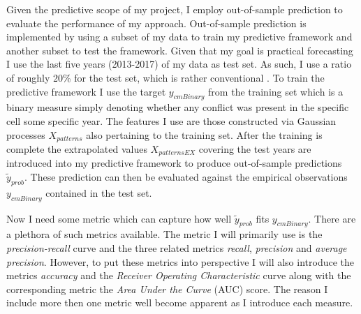 \documentclass[a4paper]{article}
\begin{document}

Given the predictive scope of my project, I employ out-of-sample prediction to evaluate the performance of my approach. Out-of-sample prediction is implemented by using a subset of my data to train my predictive framework and another subset to test the framework. Given that my goal is practical forecasting I use the last five years (2013-2017) of my data as test set. As such, I use a ratio of roughly 20\% for the test set, which is rather conventional \citep{Friedman_2001, Ward_Greenhill_Bakke_2010}. To train the predictive framework I use the target $y_{cmBinary}$ from the training set which is a binary measure simply denoting whether any conflict was present in the specific cell some specific year. The features I use are those constructed via Gaussian processes $X_{patterns}$ also pertaining to the training set. After the training is complete the extrapolated values $X_{patternsEX}$ covering the test years are introduced into my predictive framework to produce out-of-sample predictions $\tilde{y}_{prob}$. These prediction can then be evaluated against the empirical observations $y_{cmBinary}$ contained in the test set.\par

Now I need some metric which can capture how well  $\tilde{y}_{prob}$ fits $y_{cmBinary}$. There are a plethora of such metrics available. The metric I will primarily use is the \emph{precision-recall} curve and the three related metrics \emph{recall}, \emph{precision} and \emph{average precision}. However, to put these metrics into perspective I will also introduce the metrics \emph{accuracy} and the \emph{Receiver Operating Characteristic} curve along with the corresponding metric the \emph{Area Under the Curve} (AUC) score. The reason I include more then one metric well become apparent as I introduce each measure.\par
\end{document}
